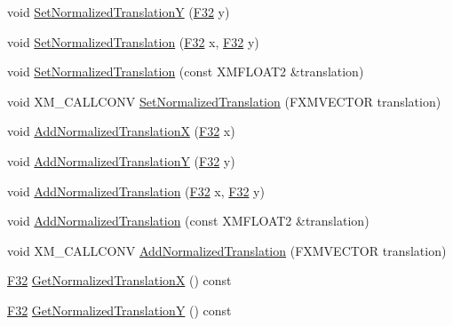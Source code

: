 \begin{DoxyCompactItemize}
\item 
void \hyperlink{structmage_1_1_sprite_transform_aac384e3769b23e4452e6dd7b416146fa}{Set\+Normalized\+TranslationY} (\hyperlink{namespacemage_aa97e833b45f06d60a0a9c4fc22ae02c0}{F32} y)
\item 
void \hyperlink{structmage_1_1_sprite_transform_a954e7a562a7c68ef402881dc982529ba}{Set\+Normalized\+Translation} (\hyperlink{namespacemage_aa97e833b45f06d60a0a9c4fc22ae02c0}{F32} x, \hyperlink{namespacemage_aa97e833b45f06d60a0a9c4fc22ae02c0}{F32} y)
\item 
void \hyperlink{structmage_1_1_sprite_transform_a2718ece51fa0cdd839620df93ac49ff1}{Set\+Normalized\+Translation} (const X\+M\+F\+L\+O\+A\+T2 \&translation)
\item 
void X\+M\+\_\+\+C\+A\+L\+L\+C\+O\+NV \hyperlink{structmage_1_1_sprite_transform_af72bc622e7512910e5a9ceb8aeeec22d}{Set\+Normalized\+Translation} (F\+X\+M\+V\+E\+C\+T\+OR translation)
\item 
void \hyperlink{structmage_1_1_sprite_transform_af766622e394f2ace0e2f999d6c642bb5}{Add\+Normalized\+TranslationX} (\hyperlink{namespacemage_aa97e833b45f06d60a0a9c4fc22ae02c0}{F32} x)
\item 
void \hyperlink{structmage_1_1_sprite_transform_aea97be812ff2a83bd255d3419354dbe3}{Add\+Normalized\+TranslationY} (\hyperlink{namespacemage_aa97e833b45f06d60a0a9c4fc22ae02c0}{F32} y)
\item 
void \hyperlink{structmage_1_1_sprite_transform_a4a55fcd4d288b5d7f7703b9a6232b2d1}{Add\+Normalized\+Translation} (\hyperlink{namespacemage_aa97e833b45f06d60a0a9c4fc22ae02c0}{F32} x, \hyperlink{namespacemage_aa97e833b45f06d60a0a9c4fc22ae02c0}{F32} y)
\item 
void \hyperlink{structmage_1_1_sprite_transform_ad5d6e1ab0012287f6ee52d19426ed6cf}{Add\+Normalized\+Translation} (const X\+M\+F\+L\+O\+A\+T2 \&translation)
\item 
void X\+M\+\_\+\+C\+A\+L\+L\+C\+O\+NV \hyperlink{structmage_1_1_sprite_transform_a167f79e773eeb4dca46915f748726113}{Add\+Normalized\+Translation} (F\+X\+M\+V\+E\+C\+T\+OR translation)
\item 
\hyperlink{namespacemage_aa97e833b45f06d60a0a9c4fc22ae02c0}{F32} \hyperlink{structmage_1_1_sprite_transform_a31bf43cccaf564054930d80e229ebef3}{Get\+Normalized\+TranslationX} () const
\item 
\hyperlink{namespacemage_aa97e833b45f06d60a0a9c4fc22ae02c0}{F32} \hyperlink{structmage_1_1_sprite_transform_a6c5685c5d45391c6d5d820677b58c976}{Get\+Normalized\+TranslationY} () const

\end{DoxyCompactItemize}
